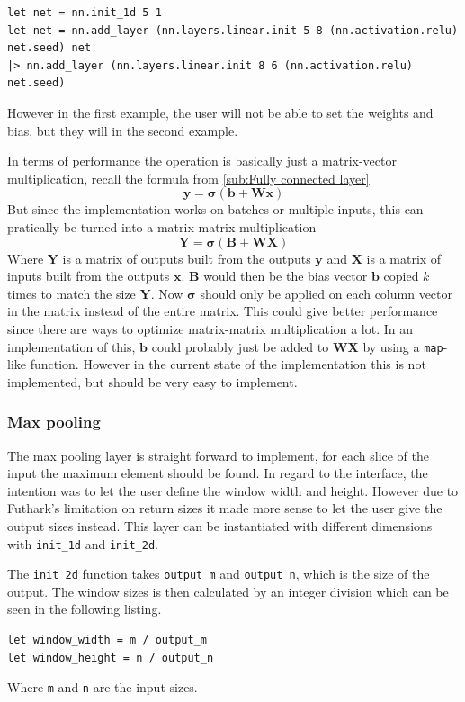 \begin{lstlisting}
let net = nn.init_1d 5 1
let net = nn.add_layer (nn.layers.linear.init 5 8 (nn.activation.relu) net.seed) net
|> nn.add_layer (nn.layers.linear.init 8 6 (nn.activation.relu) net.seed)
\end{lstlisting}

However in the first example, the user will not be able to set the weights and bias, but they will in the second example.

In terms of performance the operation is basically just a matrix-vector multiplication, recall the formula from \autoref{sub:Fully connected layer}
$$\bm{y} = \bm{\sigma} \left( \bm{b} + \bm{W} \bm{x} \right)$$
But since the implementation works on batches or multiple inputs, this can pratically be turned into a matrix-matrix multiplication
$$\bm{Y} = \bm{\sigma} \left( \bm{B} + \bm{W} \bm{X} \right)$$
Where $\bm{Y}$ is a matrix of outputs built from the outputs $\bm{y}$ and $\bm{X}$ is a matrix of inputs built from the outputs $\bm{x}$. $\bm{B}$ would then be the bias vector $\bm{b}$ copied $k$ times to match the size $\bm{Y}$.
Now $\bm{\sigma}$ should only be applied on each column vector in the matrix instead of the entire matrix.
This could give better performance since there are ways to optimize matrix-matrix multiplication a lot.
In an implementation of this, $\bm{b}$ could probably just be added to $\bm{WX}$ by using a \texttt{map}-like function.
However in the current state of the implementation this is not implemented, but should be very easy to implement.

\subsubsection{Max pooling}
\label{ssub:impl_max_pool}

The max pooling layer is straight forward to implement, for each slice of the input the maximum element should be found.
In regard to the interface, the intention was to let the user define the window width and height.
However due to Futhark's limitation on return sizes it made more sense to let the user give the output sizes instead.
This layer can be instantiated with different dimensions with \texttt{init\_1d} and \texttt{init\_2d}.

The \texttt{init\_2d} function takes \texttt{output\_m} and \texttt{output\_n}, which is the size of the output.
The window sizes is then calculated by an integer division which can be seen in the following listing.
\begin{lstlisting}
let window_width = m / output_m
let window_height = n / output_n
\end{lstlisting}
Where \texttt{m} and \texttt{n} are the input sizes.

